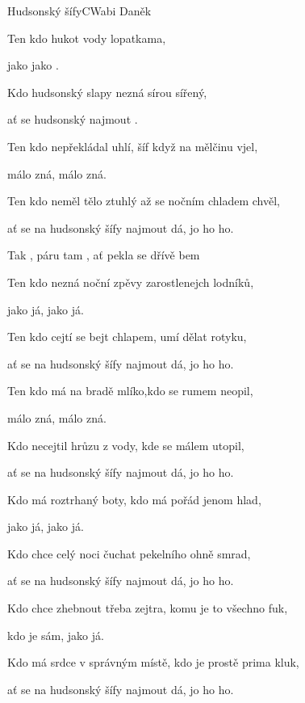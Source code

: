 \begin{song}{Hudsonský šífy}{C}{Wabi Daněk}
\begin{SBVerse}
Ten kdo  hukot vody lopatkama,

jako  jako .

Kdo hudsonský slapy nezná sírou  sířený,
 
ať se hudsonský  najmout    .
\end{SBVerse}
\begin{SBVerse}
Ten kdo nepřekládal uhlí, šíf když na mělčinu vjel, 

málo zná, málo zná.

Ten kdo neměl tělo ztuhlý až se nočním chladem chvěl,

ať se na hudsonský šífy najmout dá, jo ho ho.

\end{SBVerse}
\begin{SBChorus}
Tak , páru tam , ať  pekla se dřívě bem

  
\end{SBChorus}
\begin{SBVerse}

Ten kdo nezná noční zpěvy zarostlenejch lodníků,

jako já, jako já.

Ten kdo cejtí se bejt chlapem, umí dělat rotyku,

ať se na hudsonský šífy najmout dá, jo ho ho.
\end{SBVerse}
\begin{SBVerse}
Ten kdo má na bradě mlíko,kdo se rumem neopil, 

málo zná, málo zná.

Kdo necejtil hrůzu z vody, kde se málem utopil,

ať se na hudsonský šífy najmout dá, jo ho ho.
\end{SBVerse}
\begin{SBVerse}
Kdo má roztrhaný boty, kdo má pořád jenom hlad, 

jako já, jako já.

Kdo chce celý noci čuchat pekelního ohně smrad, 

ať se na hudsonský šífy najmout dá, jo ho ho. 
\end{SBVerse}
\begin{SBVerse}
Kdo chce zhebnout třeba zejtra, komu je to všechno fuk,

kdo je sám, jako já.

Kdo má srdce v správným místě, kdo je prostě prima kluk,

ať se na hudsonský šífy najmout dá, jo ho ho.
\end{SBVerse}
\end{song}






\pagebreak